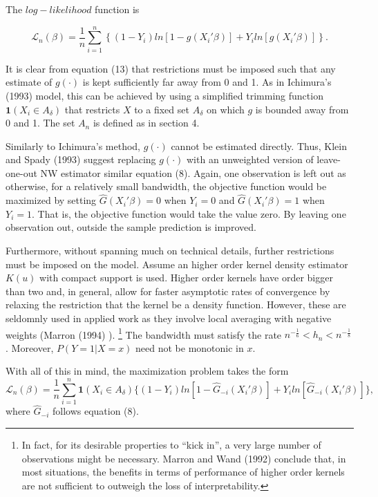 \documentclass[a4paper]{article}
\begin{document}
The $log-likelihood$ function is

\begin{equation}
\mathcal{L}_n(\beta) = \frac{1}{n}\sum_{i=1}^n \left\{ (1 - Y_i)ln[ 1 - g(X_i'\beta)] + Y_iln[g(X_i'\beta)] \right\}.
\end{equation}

It is clear from equation (13) that restrictions must be imposed such that any estimate of $g(\cdot)$ is kept sufficiently far away from 0 and 1. As in Ichimura's (1993) \cite{[6]} model, this can be achieved by using a simplified trimming function $\mathbf{1}{(X_i \in A_\delta)}$ that restricts $X$ to a fixed set $A_\delta$ on which $g$ is bounded away from 0 and 1. The set $A_n$ is defined as in section 4.

Similarly to Ichimura's method, $g(\cdot)$ cannot be estimated directly. Thus, Klein and Spady (1993) \cite{[12]} suggest replacing $g(\cdot)$ with an unweighted version of leave-one-out NW estimator similar equation (8). Again, one observation is left out as otherwise, for a relatively small bandwidth, the objective function would be maximized by setting $\hat{G}(X_i'\beta)=0$ when $Y_i=0$ and $\hat{G}(X_i'\beta)=1$ when $Y_i=1$. That is, the objective function would take the value zero. By leaving one observation out, outside the sample prediction is improved. 

Furthermore, without spanning much on technical details, further restrictions must be imposed on the model. Assume an higher order kernel density estimator $K(u)$ with compact support is used. Higher order kernels have order bigger than two and, in general, allow for faster asymptotic rates of convergence by relaxing the restriction that the kernel  be a density function. However, these are seldomnly used in applied work as they involve local averaging with negative weights (Marron (1994) \cite{[23]}). \footnote{ In fact, for its desirable properties to ``kick in'', a very large number of observations might be necessary. Marron and Wand (1992) \cite{[24]} conclude that, in most situations, the benefits in terms of performance of higher order kernels are not sufficient to outweigh the loss of interpretability.}
The bandwidth must satisfy the rate $ n^{-\frac{1}{6}} < h_n < n^{-\frac{1}{8}}$. Moreover, $P(Y=1|X=x)$ need not be monotonic in $x$.

With all of this in mind, the maximization problem takes the form
\begin{equation}
\mathcal{L}_n(\beta) = \frac{1}{n}\sum_{i=1}^n \mathbf{1}{(X_i \in A_\delta)} \{ (1 - Y_i)ln[ 1 - \hat{G}_{-i}(X_i'\beta)] +  Y_iln[\hat{G}_{-i}(X_i'\beta)]\},
\end{equation}
where $\hat{G}_{-i}$ follows equation (8).
\end{document}
